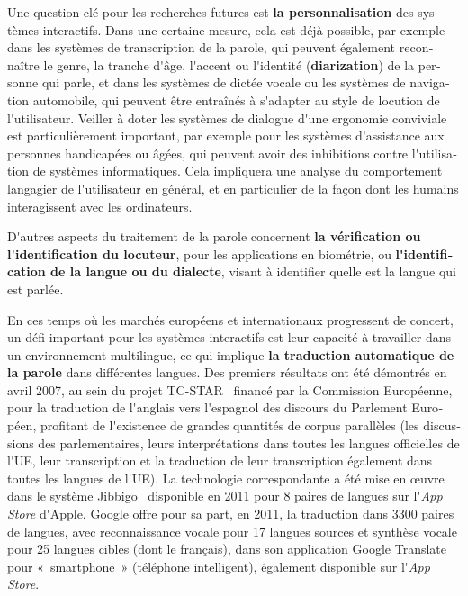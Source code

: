 \documentclass[]{../metanetpaper}
\begin{document}
\begin{french}
\begin{multicols}{2}
Une question clé pour les recherches futures est {\bf la personnalisation}
des systèmes interactifs. Dans une certaine mesure, cela est déjà
possible, par exemple dans les systèmes de transcription de la parole,
qui peuvent également reconnaître le genre, la tranche d{\mbox '}âge, l{\mbox '}accent
ou l{\mbox '}identité ({\bf diarization}) de la personne qui parle, et dans les
systèmes de dictée vocale ou les systèmes de navigation automobile,
qui peuvent être entraînés à s{\mbox '}adapter au style de locution de
l{\mbox '}utilisateur. Veiller à doter les systèmes de dialogue d{\mbox '}une ergonomie
conviviale est particulièrement important, par exemple pour les systèmes
d{\mbox '}assistance aux personnes handicapées ou âgées, qui peuvent avoir des
inhibitions contre l{\mbox '}utilisation de systèmes informatiques. Cela
impliquera une analyse du comportement langagier de l{\mbox '}utilisateur en
général, et en particulier de la façon dont les humains interagissent
avec les ordinateurs.

D{\mbox '}autres aspects du traitement de la parole concernent {\bf la vérification
ou l{\mbox '}identification du locuteur}, pour les applications en biométrie,
ou {\bf l{\mbox '}identification de la langue ou du dialecte}, visant à identifier
quelle est la langue qui est parlée.

En ces temps où les marchés européens et internationaux progressent de
concert, un défi important pour les systèmes interactifs est leur
capacité à travailler dans un environnement multilingue, ce qui
implique {\bf la traduction automatique de la parole} dans différentes
langues. Des premiers résultats ont été démontrés en avril 2007, au
sein du projet TC-STAR~\cite{tcstarurl} financé par la Commission
Européenne, pour la traduction de l{\mbox '}anglais vers l{\mbox
  '}espagnol des discours du Parlement Européen, profitant de l{\mbox
  '}existence de grandes quantités de corpus parallèles (les
discussions des parlementaires, leurs interprétations dans toutes les
langues officielles de l{\mbox '}UE, leur transcription et la
traduction de leur transcription également dans toutes les langues de
l{\mbox '}UE). La technologie correspondante a été mise en œuvre dans
le système Jibbigo~\cite{jibbigo} disponible en 2011 pour 8 paires de langues
sur l{\mbox '}{\em {\mbox App Store}} d{\mbox '}Apple. Google offre
pour sa part, en 2011, la traduction dans 3300 paires de langues, avec
reconnaissance vocale pour 17 langues sources et synthèse vocale pour
25 langues cibles (dont le français), dans son application Google
Translate pour «~smartphone~» (téléphone intelligent), également
disponible sur l{\mbox '}{\em {\mbox App Store}}.


\end{multicols}
\end{french}
\end{document}
